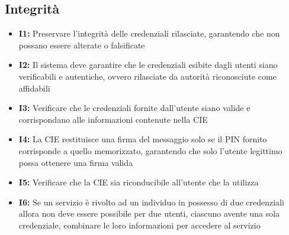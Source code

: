     \subsection{Integrità}
        \begin{itemize}
                \item \textbf{I1:} Preservare l'integrità delle credenziali rilasciate, garantendo che non possano essere alterate o falsificate
            
            \item \textbf{I2:} Il sistema deve garantire che le credenziali esibite dagli utenti siano verificabili e autentiche, ovvero rilasciate da autorità riconosciute come affidabili
            
            \item \textbf{I3:} Verificare che le credenziali fornite dall'utente siano valide e corrispondano alle informazioni contenute nella CIE

            \item \textbf{I4:} La CIE restituisce una firma del messaggio solo se il PIN fornito corrisponde a quello memorizzato, garantendo che solo l'utente legittimo possa ottenere una firma valida

            \item \textbf{I5:} Verificare che la CIE sia riconducibile all'utente che la utilizza
            
            \item \textbf{I6:} Se un servizio è rivolto ad un individuo in possesso di due credenziali allora non deve essere possibile per due utenti, ciascuno avente una sola credenziale, combinare le loro informazioni per accedere al servizio
        \end{itemize}


